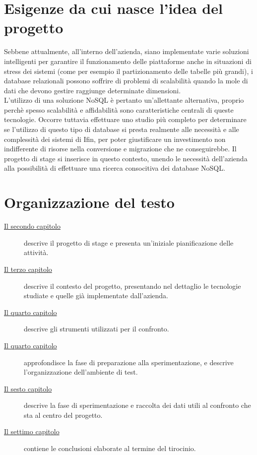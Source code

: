 \section{Esigenze da cui nasce l'idea del progetto}

Sebbene attualmente, all'interno dell'azienda, siano implementate varie soluzioni intelligenti per garantire il funzionamento delle piattaforme anche in situazioni di stress dei sistemi (come per esempio il partizionamento delle tabelle più grandi), i database relazionali possono soffrire di problemi di scalabilità quando la mole di dati che devono gestire raggiunge determinate dimensioni.\\
L'utilizzo di una soluzione NoSQL è pertanto un'allettante alternativa, proprio perchè spesso scalabilità e affidabilità sono caratteristiche centrali di queste tecnologie\cite{site:mongoarticleadvantages}. Occorre tuttavia effettuare uno studio più completo per determinare se l'utilizzo di questo tipo di database si presta realmente alle necessità e alle complessità dei sistemi di Ifin, per poter giustificare un investimento non indifferente di risorse nella conversione e migrazione che ne conseguirebbe.
Il progetto di stage si inserisce in questo contesto, unendo le necessità dell'azienda alla possibilità di effettuare una ricerca consocitiva dei database NoSQL.\\

\section{Organizzazione del testo}

\begin{description}
    \item[{\hyperref[cap:descrizione-stage]{Il secondo capitolo}}] descrive il progetto di stage e presenta un'iniziale pianificazione delle attività.
    
    \item[{\hyperref[cap:contesto]{Il terzo capitolo}}] descrive il contesto del progetto, presentando nel dettaglio le tecnologie studiate e quelle già implementate dall'azienda.
    
    \item[{\hyperref[cap:strumenti]{Il quarto capitolo}}] descrive gli strumenti utilizzati per il confronto.

    \item[{\hyperref[cap:progettazione]{Il quarto capitolo}}] approfondisce la fase di preparazione alla sperimentazione, e descrive l'organizzazione dell'ambiente di test.
    
    \item[{\hyperref[cap:sperimentazione]{Il sesto capitolo}}] descrive la fase di sperimentazione e raccolta dei dati utili al confronto che sta al centro del progetto.
    
    \item[{\hyperref[cap:conclusioni]{Il settimo capitolo}}] contiene le conclusioni elaborate al termine del tirocinio.
\end{description}